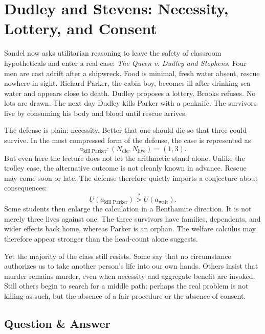 \section{Dudley and Stevens: Necessity, Lottery, and Consent}

Sandel now asks utilitarian reasoning to leave the safety of classroom hypotheticals and enter a real case: \emph{The Queen v. Dudley and Stephens}. Four men are cast adrift after a shipwreck. Food is minimal, fresh water absent, rescue nowhere in sight. Richard Parker, the cabin boy, becomes ill after drinking sea water and appears close to death. Dudley proposes a lottery. Brooks refuses. No lots are drawn. The next day Dudley kills Parker with a penknife. The survivors live by consuming his body and blood until rescue arrives.

The defense is plain: necessity. Better that one should die so that three could survive. In the most compressed form of the defense, the case is represented as
\begin{equation}
a_{\text{kill Parker}} : (N_{\text{die}},N_{\text{live}}) = (1,3).
\end{equation}
But even here the lecture does not let the arithmetic stand alone. Unlike the trolley case, the alternative outcome is not cleanly known in advance. Rescue may come soon or late. The defense therefore quietly imports a conjecture about consequences:
\begin{equation}
U(a_{\text{kill Parker}}) \stackrel{?}{>} U(a_{\text{wait}}).
\end{equation}
Some students then enlarge the calculation in a Benthamite direction. It is not merely three lives against one. The three survivors have families, dependents, and wider effects back home, whereas Parker is an orphan. The welfare calculus may therefore appear stronger than the head-count alone suggests.

Yet the majority of the class still resists. Some say that no circumstance authorizes us to take another person's life into our own hands. Others insist that murder remains murder, even when necessity and aggregate benefit are invoked. Still others begin to search for a middle path: perhaps the real problem is not killing as such, but the absence of a fair procedure or the absence of consent.

\subsection{Question \& Answer}

